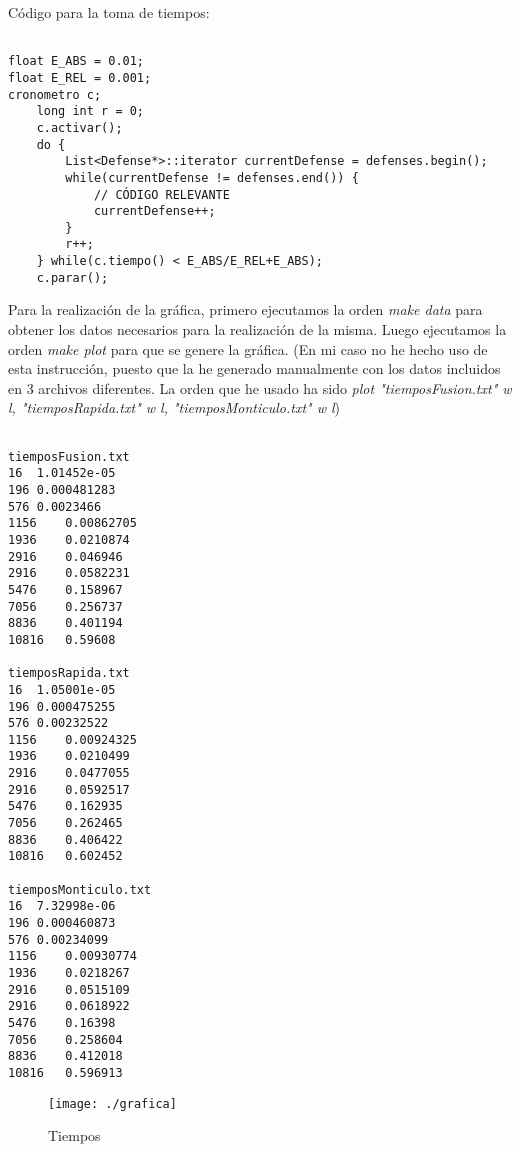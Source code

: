 Código para la toma de tiempos:

\begin{lstlisting}

float E_ABS = 0.01;
float E_REL = 0.001;
cronometro c;
    long int r = 0;
    c.activar();
    do {	
		List<Defense*>::iterator currentDefense = defenses.begin();
		while(currentDefense != defenses.end()) {
			// CÓDIGO RELEVANTE
            currentDefense++;
		}
		r++;
    } while(c.tiempo() < E_ABS/E_REL+E_ABS);
    c.parar();

\end{lstlisting}

Para la realización de la gráfica, primero ejecutamos la orden \textit{make data} para obtener los datos necesarios para la realización de la misma.
Luego ejecutamos la orden \textit{make plot} para que se genere la gráfica. (En mi caso no he hecho uso de esta instrucción, puesto que la he generado manualmente con los datos incluidos en 3 archivos diferentes. La orden que he usado ha sido \textit{plot "tiemposFusion.txt" w l, "tiemposRapida.txt" w l, "tiemposMonticulo.txt" w l})


\begin{lstlisting}

tiemposFusion.txt
16	1.01452e-05
196	0.000481283
576	0.0023466
1156	0.00862705
1936	0.0210874
2916	0.046946
2916	0.0582231
5476	0.158967
7056	0.256737
8836	0.401194
10816	0.59608

tiemposRapida.txt
16	1.05001e-05
196	0.000475255
576	0.00232522
1156	0.00924325
1936	0.0210499
2916	0.0477055
2916	0.0592517
5476	0.162935
7056	0.262465
8836	0.406422
10816	0.602452

tiemposMonticulo.txt
16	7.32998e-06
196	0.000460873
576	0.00234099
1156	0.00930774
1936	0.0218267
2916	0.0515109
2916	0.0618922
5476	0.16398
7056	0.258604
8836	0.412018
10816	0.596913

\end{lstlisting}

\begin{figure}
\centering
\texttt{[image: ./grafica]}
\caption{Tiempos}
\label{fig:grafica}
\end{figure}
